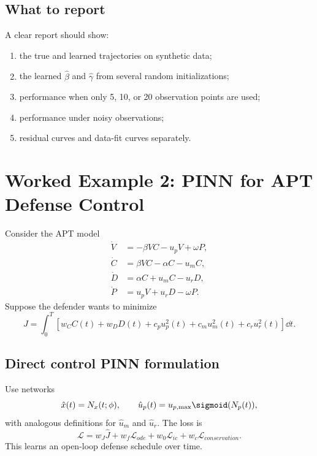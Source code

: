\documentclass[11pt,a4paper]{article}
\begin{document}
\subsection{What to report}
A clear report should show:
\begin{enumerate}[leftmargin=2em]
    \item the true and learned trajectories on synthetic data;
    \item the learned $\hat{\beta}$ and $\hat{\gamma}$ from several random initializations;
    \item performance when only 5, 10, or 20 observation points are used;
    \item performance under noisy observations;
    \item residual curves and data-fit curves separately.
\end{enumerate}

\section{Worked Example 2: PINN for APT Defense Control}

Consider the APT model
\begin{align}
    \dot{V} &= -\beta VC-u_pV+\omega P,\\
    \dot{C} &= \beta VC-\alpha C-u_mC,\\
    \dot{D} &= \alpha C+u_mC-u_rD,\\
    \dot{P} &= u_pV+u_rD-\omega P.
\end{align}
Suppose the defender wants to minimize
\begin{equation}
    J=\int_0^T\left[w_C C(t)+w_DD(t)+c_pu_p^2(t)+c_mu_m^2(t)+c_ru_r^2(t)\right]\dd t.
\end{equation}

\subsection{Direct control PINN formulation}
Use networks
\begin{equation}
    \hat{x}(t)=N_x(t;\phi),\qquad
    \hat{u}_p(t)=u_{p,\max}\sigmoid(N_p(t)),
\end{equation}
with analogous definitions for $\hat{u}_m$ and $\hat{u}_r$. The loss is
\begin{equation}
    \mathcal{L}=w_J\widehat{J}+w_f\mathcal{L}_{ode}+w_0\mathcal{L}_{ic}+w_c\mathcal{L}_{conservation}.
\end{equation}
This learns an open-loop defense schedule over time.
\end{document}
